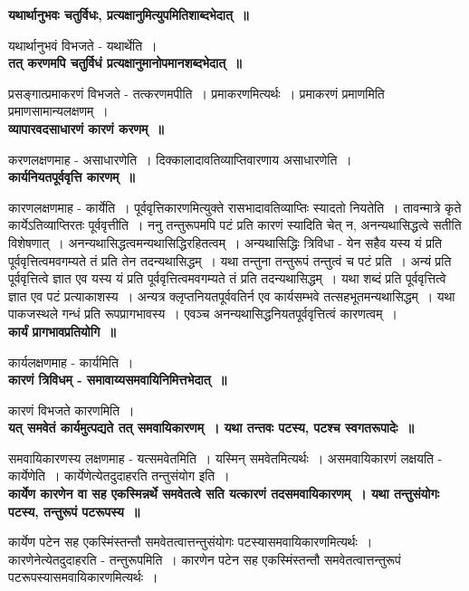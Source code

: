 	{\bfseries यथार्थानुभवः चतुर्विधः, प्रत्यक्षानुमित्युपमितिशाब्दभेदात्~॥}\par
		यथार्थानुभवं विभजते - यथार्थेति~।\\[10pt]
	{\bfseries तत् करणमपि चतुर्विधं प्रत्यक्षानुमानोपमानशब्दभेदात्~॥}\par
		प्रसङ्गात्प्रमाकरणं विभजते - तत्करणमपीति~। प्रमाकरणमित्यर्थः~। प्रमाकरणं प्रमाणमिति प्रमाणसामान्यलक्षणम्~।\\[10pt]
	{\bfseries व्यापारवदसाधारणं कारणं करणम्~॥}\par
		करणलक्षणमाह - असाधारणेति~। दिक्कालादावतिव्याप्तिवारणाय असाधारणेति~।\\[10pt]
	{\bfseries कार्यनियतपूर्ववृत्ति कारणम्~॥}\par
		कारणलक्षणमाह - कार्येति~। पूर्ववृत्तिकारणमित्युक्ते रासभादावतिव्याप्तिः स्यादतो नियतेति~। तावन्मात्रे कृते कार्येऽतिव्याप्तिरतः पूर्ववृत्तीति~। ननु तन्तुरूपमपि पटं प्रति कारणं स्यादिति चेत् न, अनन्यथासिद्धत्वे सतीति विशेषणात्~। अनन्यथासिद्धत्वमन्यथासिद्धिरहितत्वम्~। अन्यथासिद्धिः त्रिविधा - येन सहैव यस्य यं प्रति पूर्ववृत्तित्वमवगम्यते तं प्रति तेन तदन्यथासिद्धम्~। यथा तन्तुना तन्तुरूपं तन्तुत्वं च पटं प्रति~। अन्यं प्रति पूर्ववृत्तित्वे ज्ञात एव यस्य यं प्रति पूर्ववृत्तित्वमवगम्यते तं प्रति तदन्यथासिद्धम्~। यथा शब्दं प्रति पूर्ववृत्तित्वे ज्ञात एव पटं प्रत्याकाशस्य~। अन्यत्र क्लृप्तनियतपूर्ववतिर्न एव कार्यसम्भवे तत्सहभूतमन्यथासिद्धम्~। यथा पाकजस्थले गन्धं प्रति रूपप्रागभावस्य~। एवञ्च अनन्यथासिद्धनियतपूर्ववृत्तित्वं कारणत्वम्~।\\[10pt]
	{\bfseries कार्यं प्रागभावप्रतियोगि~॥}\par
		कार्यलक्षणमाह - कार्यमिति~।\\[10pt]
	{\bfseries कारणं त्रिविधम् - समावाय्यसमवायिनिमित्तभेदात्~॥}\par
		कारणं विभजते कारणमिति~।\\[10pt]
	{\bfseries यत् समवेतं कार्यमुत्पद्यते तत् समवायिकारणम्~। यथा तन्तवः पटस्य, पटश्च स्वगत\-रूपादेः~॥}\par
		समवायिकारणस्य लक्षणमाह - यत्समवेतमिति~। यस्मिन् समवेतमित्यर्थः~। असमवायिकारणं लक्षयति - कार्येणेति~। कार्येणेत्येतदुदाहरति तन्तुसंयोग इति~।\\[10pt]
	{\bfseries कार्येण कारणेन वा सह एकस्मिन्नर्थे समवेतत्वे सति यत्कारणं तदसमवायिकारणम्~। यथा तन्तुसंयोगः पटस्य, तन्तुरूपं पटरूपस्य~॥}\par
		कार्येण पटेन सह एकस्मिंस्तन्तौ समवेतत्वात्तन्तुसंयोगः पटस्यासमवायिकारणमित्यर्थः~। कारणेनेत्येतदुदाहरति - तन्तुरूपमिति~। कारणेन पटेन सह एकस्मिंस्तन्तौ समवेतत्वात्तन्तुरूपं पटरूपस्यासमवायिकारणमित्यर्थः~।\\[10pt]
